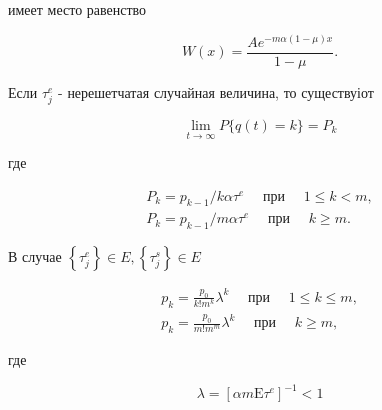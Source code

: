 \documentclass[10pt]{article}
\begin{document}
имеет место равенство



\[

W(x)=\frac{A e^{-m \alpha(1-\mu) x}}{1-\mu} .

\]



Если $\tau_{j}^{e}$ - нерешетчатая случайная величина, то существуіот



\[

\lim _{t \rightarrow \infty} P\{q(t)=k\}=P_{k}

\]



где



\[

\begin{gathered}

P_{k}=p_{k-1} / k \alpha \tau^{e} \quad \text { при } \quad 1 \leqslant k<m, \\

P_{k}=p_{k-1} / m \alpha \tau^{e} \quad \text { при } \quad k \geqslant m .

\end{gathered}

\]



В случае $\left\{\tau_{j}^{e}\right\} \in E,\left\{\tau_{j}^{s}\right\} \in E$



\[

\begin{gathered}

p_{k}=\frac{p_{0}}{k ! m^{k}} \lambda^{k} \quad \text { при } \quad 1 \leqslant k \leqslant m, \\

p_{k}=\frac{p_{0}}{m ! m^{m}} \lambda^{k} \quad \text { при } \quad k \geqslant m,

\end{gathered}

\]



где



\[

\lambda=\left[\alpha m \mathrm{E} \tau^{e}\right]^{-1}<1

\]
\end{document}
